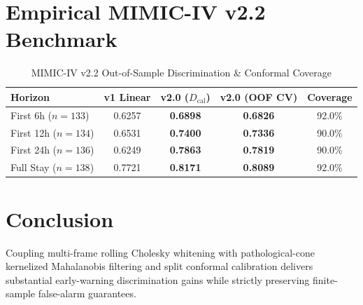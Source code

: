 \documentclass[twocolumn,10pt,journal,compsoc]{IEEEtran}
\begin{document}
\section{Empirical MIMIC-IV v2.2 Benchmark}
\begin{table}[h]
\centering
\caption{MIMIC-IV v2.2 Out-of-Sample Discrimination \& Conformal Coverage}
\begin{tabular}{lcccc}
\toprule
\textbf{Horizon} & \textbf{v1 Linear} & \textbf{v2.0 ($D_{\text{cal}}$)} & \textbf{v2.0 (OOF CV)} & \textbf{Coverage} \\
\midrule
First 6h ($n=133$) & 0.6257 & \textbf{0.6898} & \textbf{0.6826} & 92.0\% \\
First 12h ($n=134$) & 0.6531 & \textbf{0.7400} & \textbf{0.7336} & 90.0\% \\
First 24h ($n=136$) & 0.6249 & \textbf{0.7863} & \textbf{0.7819} & 90.0\% \\
Full Stay ($n=138$) & 0.7721 & \textbf{0.8171} & \textbf{0.8089} & 92.0\% \\
\bottomrule
\end{tabular}
\end{table}

\section{Conclusion}
Coupling multi-frame rolling Cholesky whitening with pathological-cone kernelized Mahalanobis filtering and split conformal calibration delivers substantial early-warning discrimination gains while strictly preserving finite-sample false-alarm guarantees.
\end{document}
